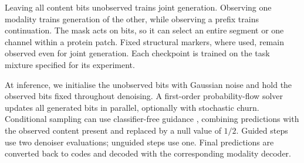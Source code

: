 Leaving all content bits unobserved trains joint generation. Observing one modality trains
generation of the other, while observing a prefix trains continuation. The mask acts on bits,
so it can select an entire segment or one channel within a protein patch. Fixed structural
markers, where used, remain observed even for joint generation. Each checkpoint is trained on
the task mixture specified for its experiment.

At inference, we initialise the unobserved bits with Gaussian noise and hold the observed bits
fixed throughout denoising. A first-order probability-flow solver updates all generated bits in
parallel, optionally with stochastic churn. Conditional sampling can use classifier-free guidance
\citep{method:cfg}, combining predictions with the observed content present and replaced by a
null value of $1/2$. Guided steps use two denoiser evaluations; unguided steps use one.
Final predictions are converted back to codes and decoded with the corresponding modality
decoder.
